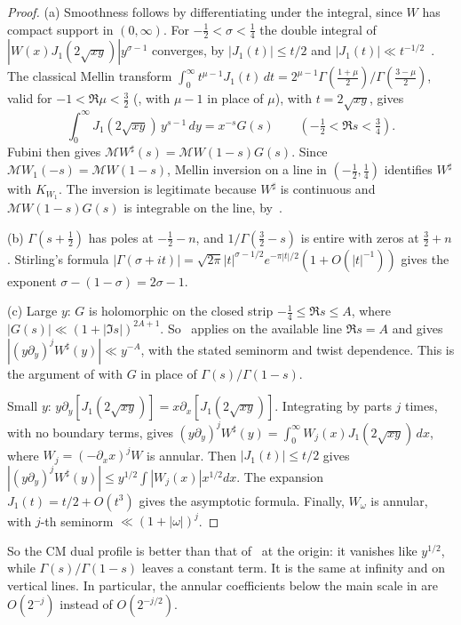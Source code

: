 \documentclass[11pt]{article}
\numberwithin{equation}{section}
\begin{document}
\begin{proof}
(a) Smoothness follows by differentiating under the integral, since $W$ has compact support in
$(0,\infty)$. For $-\frac12<\sigma<\frac14$ the double integral of $|W(x)J_1(2\sqrt{xy})|y^{\sigma-1}$
converges, by $|J_1(t)|\le t/2$ and $|J_1(t)|\ll t^{-1/2}$~\cite[(10.14.4), (10.7.8)]{DLMF}. The classical Mellin transform
$\int_0^\infty t^{\mu-1}J_1(t)\,dt=2^{\mu-1}\Gamma(\frac{1+\mu}2)/\Gamma(\frac{3-\mu}2)$, valid for
$-1<\Re\mu<\frac32$ (\cite[(10.22.43)]{DLMF}, with $\mu-1$ in place of $\mu$), with $t=2\sqrt{xy}$, gives
\begin{equation}\label{eq:d182}
 \int_0^\infty J_1(2\sqrt{xy})\,y^{s-1}\,dy=x^{-s}G(s)\qquad(-\tfrac12<\Re s<\tfrac34).
\end{equation}
Fubini then gives $\mathcal MW^\sharp(s)=\mathcal MW(1-s)G(s)$. Since $\mathcal MW_1(-s)=\mathcal MW(1-s)$,
Mellin inversion on a line in $(-\frac12,\frac14)$ identifies $W^\sharp$ with $K_{W_1}$. The inversion is
legitimate because $W^\sharp$ is continuous and $\mathcal MW(1-s)G(s)$ is integrable on the line,
by~\cite[eq.~(4.11)]{OAI78}.

(b) $\Gamma(s+\frac12)$ has poles at $-\frac12-n$, and $1/\Gamma(\frac32-s)$ is entire with zeros at
$\frac32+n$. Stirling's formula $|\Gamma(\sigma+it)|=\sqrt{2\pi}|t|^{\sigma-1/2}e^{-\pi|t|/2}(1+O(|t|^{-1}))$
gives the exponent $\sigma-(1-\sigma)=2\sigma-1$.

(c) Large $y$: $G$ is holomorphic on the closed strip $-\frac14\le\Re s\le A$, where
$|G(s)|\ll(1+|\Im s|)^{2A+1}$. So~\cite[Lemma~4.7]{OAI78} applies on the available line
$\Re s=A$ and gives $|(y\partial_y)^jW^\sharp(y)|\ll y^{-A}$, with the stated seminorm and twist
dependence. This is the argument of \cite[Section~18.1]{OAI78} with $G$ in place of $\Gamma(s)/\Gamma(1-s)$.

Small $y$: $y\partial_y[J_1(2\sqrt{xy})]=x\partial_x[J_1(2\sqrt{xy})]$. Integrating by parts $j$ times,
with no boundary terms, gives $(y\partial_y)^jW^\sharp(y)=\int_0^\infty W_j(x)J_1(2\sqrt{xy})\,dx$, where
$W_j=(-\partial_xx)^jW$ is annular. Then $|J_1(t)|\le t/2$ gives
$|(y\partial_y)^jW^\sharp(y)|\le y^{1/2}\int|W_j(x)|x^{1/2}dx$. The expansion $J_1(t)=t/2+O(t^3)$ gives the
asymptotic formula. Finally, $W_\omega$ is annular, with $j$-th seminorm $\ll(1+|\omega|)^j$.
\end{proof}

So the CM dual profile is better than that of~\cite{OAI78} at the origin: it vanishes like $y^{1/2}$,
while $\Gamma(s)/\Gamma(1-s)$ leaves a constant term. It is the same at infinity and on vertical lines.
In particular, the annular coefficients below the main scale in \cite[Section~18.1]{OAI78} are $O(2^{-j})$ instead
of $O(2^{-j/2})$.
\end{document}
